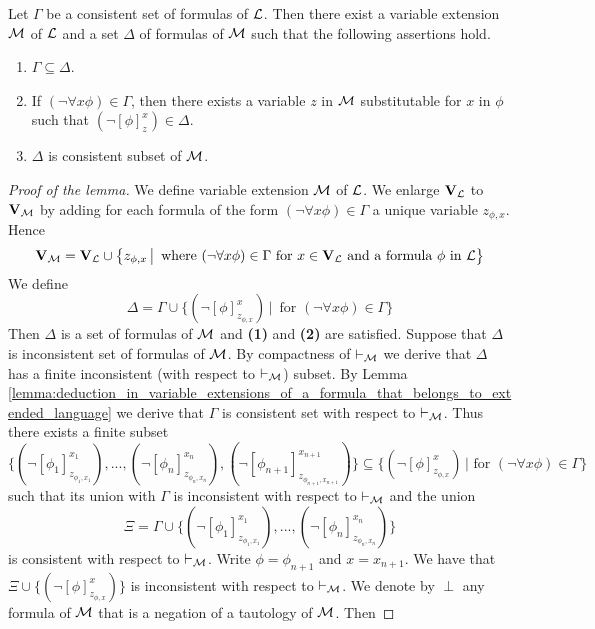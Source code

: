\begin{lemma}\label{lemma:superconsistent_extension}
Let $\Gamma$ be a consistent set of formulas of ${\mathcal L}$. Then there exist a variable extension ${\mathcal M}$ of ${\mathcal L}$ and a set $\Delta$ of formulas of ${\mathcal M}$ such that the following assertions hold.
\begin{enumerate}[label=\emph{\textbf{(\arabic*)}}, leftmargin=3.0em]
\item $\Gamma \subseteq \Delta$.
\item If $(\neg\forall x\phi) \in \Gamma$, then there exists a variable $z$ in ${\mathcal M}$ substitutable for $x$ in $\phi$ such that $(\neg[\phi]^x_z) \in \Delta$.
\item $\Delta$ is consistent subset of
${\mathcal M}$.
\end{enumerate}
\end{lemma}
\begin{proof}[Proof of the lemma]
We define variable extension ${\mathcal M}$ of ${\mathcal L}$. We enlarge $\mathbf{V}_{{\mathcal L}}$ to $\mathbf{V}_{{\mathcal M}}$ by adding for each formula of the form $(\neg\forall x\phi) \in \Gamma$ a unique variable $z_{\phi,x}$. Hence
$$\mathbf{V}_{{\mathcal M}} = \mathbf{V}_{{\mathcal L}} \cup \big\{z_{\phi,x}\,\big|\,\mbox{ where }(\neg\forall x\phi) \in \Gamma\mbox{ for }x \in \mathbf{V}_{{\mathcal L}}\mbox{ and a formula }\phi\mbox{ in }{\mathcal L}\big\}$$
We define
$$\Delta = \Gamma \cup \big\{(\neg[\phi]^x_{z_{\phi,x}})\,\big|\,\mbox{ for $(\neg\forall x\phi) \in \Gamma$}\big\}$$
Then $\Delta$ is a set of formulas of ${\mathcal M}$ and \textbf{(1)} and \textbf{(2)} are satisfied. Suppose that $\Delta$ is inconsistent set of formulas of ${\mathcal M}$. By compactness of $\vdash_{{\mathcal M}}$ we derive that $\Delta$ has a finite inconsistent (with respect to $\vdash_{{\mathcal M}}$) subset. By Lemma \ref{lemma:deduction_in_variable_extensions_of_a_formula_that_belongs_to_extended_language} we derive that $\Gamma$ is consistent set with respect to $\vdash_{{\mathcal M}}$. Thus there exists a finite subset $$\bigg\{\left(\neg[\phi_1]^{x_1}_{z_{\phi_1,x_1}}\right),...,\left(\neg[\phi_n]^{x_n}_{z_{\phi_n,x_n}}\right),\left(\neg[\phi_{n+1}]^{x_{n+1}}_{z_{\phi_{n+1},x_{n+1}}}\right)\bigg\} \subseteq \bigg\{\left(\neg[\phi]^x_{z_{\phi,x}}\right)\,\bigg| \mbox{ for } \left(\neg\forall x\phi\right) \in \Gamma\bigg\}$$
such that its union with $\Gamma$ is inconsistent with respect to $\vdash_{{\mathcal M}}$ and the union
$$\Xi = \Gamma \cup \bigg\{\left(\neg[\phi_1]^{x_1}_{z_{\phi_1,x_1}}\right),...,\left(\neg[\phi_n]^{x_n}_{z_{\phi_n,x_n}}\right)\bigg\}$$
is consistent with respect to $\vdash_{{\mathcal M}}$. Write $\phi = \phi_{n+1}$ and $x = x_{n+1}$. We have that $\Xi \cup \bigg\{\left(\neg[\phi]^x_{z_{\phi,x}}\right)\bigg\}$ is inconsistent with respect to $\vdash_{{\mathcal M}}$. We denote by $\perp$ any formula of ${\mathcal M}$ that is a negation of a tautology of ${\mathcal M}$. Then

\end{proof}
